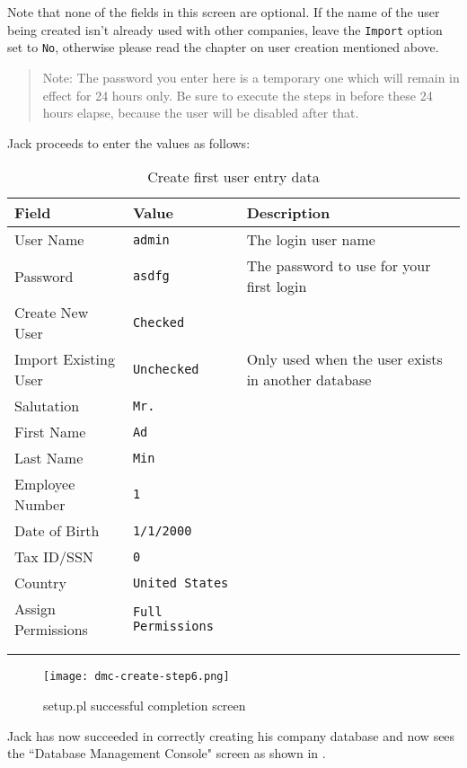Note that none of the fields in this screen are optional. If the name of the user being created
isn't already used with other companies, leave the \texttt{Import} option set to \texttt{No},
otherwise please read the chapter on user creation mentioned above.

\begin{quotation}
Note: The password you enter here is a temporary one which will remain in effect for 24
hours only. Be sure to execute the steps in  before
these 24 hours elapse, because the user will be disabled after that.
\end{quotation}

Jack proceeds to enter the values as follows:
\begin{longtable}{ llp{6cm} }
	Field & Value & Description \\ \hline
	\endhead
	User Name & \texttt{admin} & The login user name\\
	Password & \texttt{asdfg} & The password to use for your first login\\
	Create New User & \texttt{Checked} & \\
	Import Existing User & \texttt{Unchecked} & Only used when the user exists in another database\\
	Salutation & \texttt{Mr.} & \\
	First Name &  \texttt{Ad} & \\
	Last Name & \texttt{Min} & \\
	Employee Number & \texttt{1} & \\
	Date of Birth & \texttt{1/1/2000} & \\
	Tax ID/SSN & \texttt{0} & \\
	Country & \texttt{United States} & \\
	Assign Permissions & \texttt{Full Permissions} & \\
	\\
	\caption{Create first user entry data}
	\label{tbl:setupp-step5-user-entry-data}
\end{longtable}

\begin{figure}[h]
\centering
\texttt{[image: dmc-create-step6.png]}
\caption{setup.pl successful completion screen}
\label{fig:setup-step6}
\end{figure}

Jack has now succeeded in correctly creating his company database and now sees the
 ``Database Management Console"  screen as shown in .

